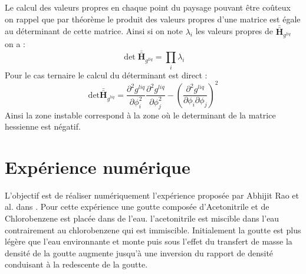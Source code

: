 \documentclass[a4paper,11pt,fleqn]{report}    %
\newcommand{\Mb}{\mathbf}
\newcommand{\doubleoverline}[1]{\bar{\bar{#1}}} 			%
\begin{document}
Le calcul des valeurs propres en chaque point du paysage pouvant être coûteux on rappel que par théorème le produit des valeurs propres d'une matrice est égale au déterminant de cette matrice. Ainsi si on note $\lambda_i$ les valeurs propres de $\Mb{\doubleoverline{H}}_{g^{liq}}$ on a :
\begin{equation}
	\det{\Mb{\doubleoverline{H}}_{g^{liq}}} = \prod_i \lambda_i
\end{equation}
Pour le cas ternaire le calcul du déterminant est direct :
\begin{equation}
	\text{det}  \Mb{\doubleoverline{H}}_{g^{liq}}   =  \frac{\partial^2 g^{liq}}{\partial \phi_i^2}
	\frac{\partial^2 g^{liq}}{\partial \phi_j^2}-\left(\frac{\partial^2 g^{liq} }{\partial \phi_i \partial \phi_j} \right)^2
\end{equation}
Ainsi la zone instable correspond à la zone où le determinant de la matrice hessienne est négatif.


\section{Expérience numérique}

L'objectif est de réaliser numériquement l'expérience proposée par Abhijit Rao et al. dans \cite{rao_influence_2015}. Pour cette expérience une goutte composée d'Acetonitrile et de Chlorobenzene est placée dans de l'eau. l'acetonitrile est miscible dans l'eau contrairement au chlorobenzene qui est immiscible. Initialement la goutte est plus légère que l'eau environnante et monte puis sous l'effet du transfert de masse la densité de la goutte augmente jusqu’à une inversion du rapport de densité conduisant à la redescente de la goutte.
\end{document}
